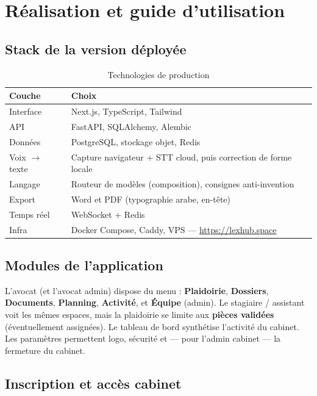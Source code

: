 \chapter{Réalisation et guide d'utilisation}
\label{ch:realisation}

\section{Stack de la version déployée}

\begin{table}[H]
\centering
\caption{Technologies de production}
\label{tab:stack}
\begin{tabular}{@{}ll@{}}
\toprule
\textbf{Couche} & \textbf{Choix} \\
\midrule
Interface & Next.js, TypeScript, Tailwind \\
API & FastAPI, SQLAlchemy, Alembic \\
Données & PostgreSQL, stockage objet, Redis \\
Voix $\rightarrow$ texte & Capture navigateur + STT cloud, puis correction de forme locale \\
Langage & Routeur de modèles (composition), consignes anti-invention \\
Export & Word et PDF (typographie arabe, en-tête) \\
Temps réel & WebSocket + Redis \\
Infra & Docker Compose, Caddy, VPS --- \url{https://lexhub.space} \\
\bottomrule
\end{tabular}
\end{table}

\section{Modules de l'application}

L'avocat (et l'avocat admin) dispose du menu : \textbf{Plaidoirie}, \textbf{Dossiers}, \textbf{Documents}, \textbf{Planning}, \textbf{Activité}, et \textbf{Équipe} (admin). Le stagiaire / assistant voit les mêmes espaces, mais la plaidoirie se limite aux \textbf{pièces validées} (éventuellement assignées). Le tableau de bord synthétise l'activité du cabinet. Les paramètres permettent logo, sécurité et --- pour l'admin cabinet --- la fermeture du cabinet.

\section{Inscription et accès cabinet}

